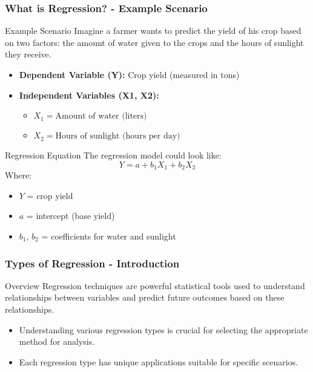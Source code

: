 \documentclass[aspectratio=169]{beamer}
\begin{document}
\begin{frame}[fragile]
    \frametitle{What is Regression? - Example Scenario}
    \begin{block}{Example Scenario}
        Imagine a farmer wants to predict the yield of his crop based on two factors: the amount of water given to the crops and the hours of sunlight they receive.
    \end{block}

    \begin{itemize}
        \item \textbf{Dependent Variable (Y):} Crop yield (measured in tons)
        \item \textbf{Independent Variables (X1, X2):} 
            \begin{itemize}
                \item $X_1 = \text{Amount of water (liters)}$
                \item $X_2 = \text{Hours of sunlight (hours per day)}$
            \end{itemize}
    \end{itemize}
    
    \begin{block}{Regression Equation}
        The regression model could look like: 
        \[
        Y = a + b_1 X_1 + b_2 X_2
        \]
        Where:
        \begin{itemize}
            \item $Y$ = crop yield
            \item $a$ = intercept (base yield)
            \item $b_1$, $b_2$ = coefficients for water and sunlight
        \end{itemize}
    \end{block}
\end{frame}

\begin{frame}[fragile]
    \frametitle{Types of Regression - Introduction}
    \begin{block}{Overview}
        Regression techniques are powerful statistical tools used to understand relationships between variables and predict future outcomes based on these relationships. 
    \end{block}
    \begin{itemize}
        \item Understanding various regression types is crucial for selecting the appropriate method for analysis.
        \item Each regression type has unique applications suitable for specific scenarios.
    \end{itemize}
\end{frame}
\end{document}
